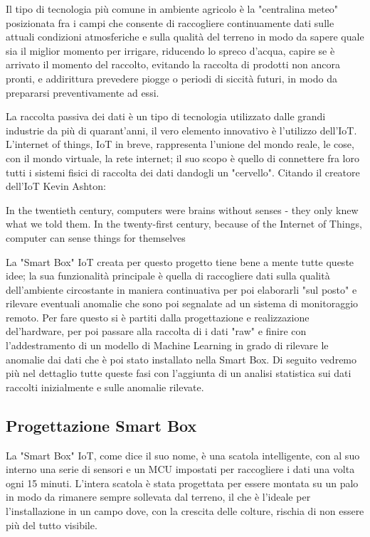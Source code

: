 \documentclass[a4paper, 12pt]{report}
\begin{document}
Il tipo di tecnologia più comune in ambiente agricolo è la "centralina meteo" posizionata fra i campi che consente di raccogliere continuamente dati sulle attuali condizioni atmosferiche e sulla qualità del terreno in modo
da sapere quale sia il miglior momento per irrigare, riducendo lo spreco d'acqua, capire se è arrivato il momento del raccolto, evitando la raccolta di prodotti non ancora pronti, e addirittura prevedere piogge o 
periodi di siccità futuri, in modo da prepararsi preventivamente ad essi.

La raccolta passiva dei dati è un tipo di tecnologia utilizzato dalle grandi industrie da più di quarant'anni, il vero elemento innovativo è l'utilizzo dell'IoT. L'internet of things\cite{iot}, IoT in breve, rappresenta l'unione del
mondo reale, le cose, con il mondo virtuale, la rete internet; il suo scopo è quello di connettere fra loro tutti i sistemi fisici di raccolta dei dati dandogli un "cervello". Citando il creatore dell'IoT Kevin Ashton: 

\begin{displayquote}
  In the twentieth century, computers were brains without senses - they only knew what we told them. In the twenty-first century, because of the Internet of Things, computer can sense things for themselves
\end{displayquote}

La "Smart Box" IoT creata per questo progetto tiene bene a mente tutte queste idee; la sua funzionalità principale è quella di raccogliere dati sulla qualità dell'ambiente circostante in maniera continuativa per poi 
elaborarli "sul posto" e rilevare eventuali anomalie che sono poi segnalate ad un sistema di monitoraggio remoto. Per fare questo si è partiti dalla progettazione e realizzazione del'hardware, per poi passare alla raccolta
di i dati "raw" e finire con l'addestramento di un modello di Machine Learning in grado di rilevare le anomalie dai dati che è poi stato installato nella Smart Box.
Di seguito vedremo più nel dettaglio tutte queste fasi con l'aggiunta di un analisi statistica sui dati raccolti inizialmente e sulle anomalie rilevate.

\subsection*{Progettazione Smart Box}
\vspace{0.5cm}

La "Smart Box" IoT, come dice il suo nome, è una scatola intelligente, con al suo interno una serie di sensori e un MCU impostati per raccogliere i dati una volta ogni 15 minuti. L'intera scatola è stata progettata 
per essere montata su un palo in modo da rimanere sempre sollevata dal terreno, il che è l'ideale per l'installazione in un campo dove, con la crescita delle colture, rischia di non essere più del tutto visibile.
\end{document}

